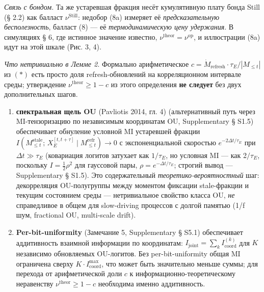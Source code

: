\documentclass[pdflatex,sn-mathphys-ay]{sn-jnl}
\begin{document}
\emph{Связь с бондом.} Та же устаревшая фракция несёт кумулятивную плату бонда Still (§ 2.2) как балласт \(\nu^{\text{Still}}\): недобор (8a) измеряет её \emph{предсказательную бесполезность}, балласт (8) --- её \emph{термодинамическую цену удержания}. В симуляциях § 6, где истинное значение известно, \(\nu^{\text{theor}} = \nu^{\text{op}}\), и иллюстрации (8a) идут на этой шкале (Рис. 3, 4).



\emph{Что нетривиально в Лемме 2.} Формально арифметическое \(c = \dot{M}_{\text{refresh}} \cdot \tau_E / |M_{\le t}|\) из \((*)\) есть просто доля refresh-обновлений на корреляционном интервале среды; утверждение \(\nu^{\text{theor}} \ge 1 - c\) из этого определения \textbf{не следует} без двух дополнительных шагов.



\begin{enumerate}

\def\labelenumi{(\roman{enumi})}

\item

  \textbf{спектральная щель OU} (Pavliotis 2014, гл. 4) (альтернативный путь через MI-тензоризацию по независимым координатам OU, Supplementary § S1.5) обеспечивает обнуление условной MI устаревшей фракции \(I(M_{\le t}^{\text{stale}};\, X_E^{[t,t+\tau]} \mid M_{\le t}^{\text{refr}}) \to 0\) с экспоненциальной скоростью \(e^{-2\Delta t/\tau_E}\) при \(\Delta t \gg \tau_E\) (ковариация логитов затухает как \(1/\tau_E\), но условная MI --- как 2\(/\tau_E\), поскольку \(I = \tfrac12\rho^2\) для гауссовой пары, \(\rho = e^{-\Delta t/\tau_E}\); строгий вывод --- Supplementary § S1.5). Это содержательный \emph{теоретико-вероятностный} шаг: декорреляция OU-полугруппы между моментом фиксации stale-фракции и текущим состоянием среды --- нетривиальное свойство класса OU, \emph{не} справедливое в общем для slow-driving процессов с долгой памятью (1/f шум, fractional OU, multi-scale drift).

\item

  \textbf{Per-bit-uniformity} (Замечание 5, Supplementary § S5.1) обеспечивает аддитивность взаимной информации по координатам: \(I_{\text{joint}} = \sum_k I_{\text{coord}}^{(k)}\) для \(K\) независимо обновляемых OU-логитов. Без per-bit-uniformity общая MI ограничена сверху \(K \cdot I_{\text{coord}}^{\max}\), что может быть значительно меньше суммы; для перехода от арифметической доли \(c\) к информационно-теоретическому неравенству \(\nu^{\text{theor}} \ge 1-c\) необходима именно аддитивность.

\end{enumerate}
\end{document}
